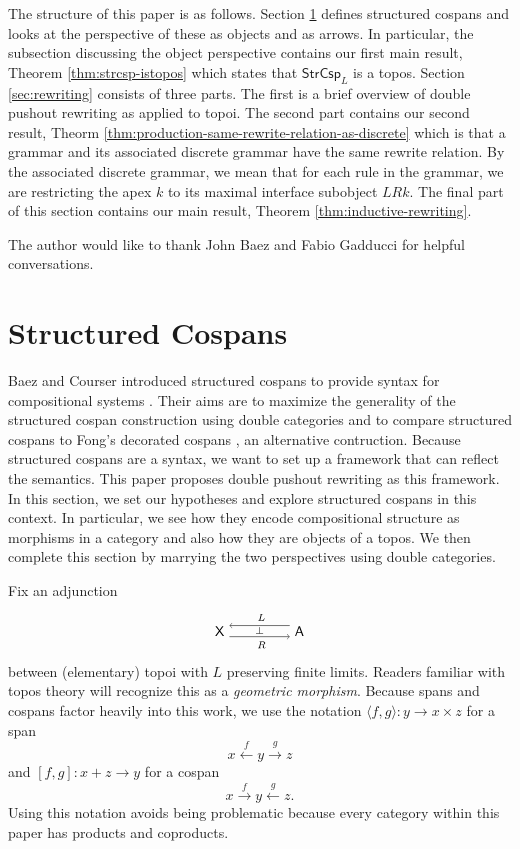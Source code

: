 \documentclass{amsart}
\newcommand{\A}{\cat{A}}
\newcommand{\X}{\cat{X}}
\newcommand{\StrCsp}{\cat{StrCsp}}
\newcommand{\cat}[1]{\mathsf{#1}}
\newcommand{\from}{\colon}
\newcommand{\xto}[1]{\xrightarrow{#1}}
\newcommand{\xgets}[1]{\xleftarrow{#1}}
\newcommand{\spn}[3]{#2 \to #1 \times #3}
\newcommand{\csp}[3]{#1 + #3 \to #2}
\theoremstyle{remark}
\theoremstyle{definition}
\newcommand{\adjunction}[4]{%
  \begin{tikzpicture}[baseline=-3pt]
    \node (1) at (0,0) {\( #1 \)};
    \node (2) at (2,0) {\( #4 \)};
    \draw [->]
    ([yshift= 4pt]2.west) to
    node [above] {\scriptsize{ $ #2 $ }}
    ([yshift= 4pt]1.east);
    \draw [->]
    ([yshift= -4pt]1.east) to
    node [below] {\scriptsize{ $ #3 $ }}
    node [above,yshift= -1.5pt] {\scriptsize{$ \perp $}}
    ([yshift= -4pt]2.west);
  \end{tikzpicture}
}
\begin{document}
The structure of this paper is as follows.  Section \ref{sec:StrCsp}
defines structured cospans and looks at the perspective of these as
objects and as arrows.  In particular, the subsection discussing the
object perspective contains our first main result, Theorem
\ref{thm:strcsp-istopos} which states that $ \StrCsp_L $ is a topos.
Section \ref{sec:rewriting} consists of three parts.  The first is a
brief overview of double pushout rewriting as applied to topoi.  The
second part contains our second result, Theorm
\ref{thm:production-same-rewrite-relation-as-discrete} which is that a
grammar and its associated discrete grammar have the same rewrite
relation.  By the associated discrete grammar, we mean that for each
rule in the grammar, we are restricting the apex $ k $ to its maximal
interface subobject $ LRk $.  The final part of this section contains
our main result, Theorem \ref{thm:inductive-rewriting}. 

The author would like to thank John Baez and Fabio Gadducci for
helpful conversations.


\section{Structured Cospans}
\label{sec:StrCsp}

Baez and Courser introduced structured cospans to provide syntax for
compositional systems \cite{StrCsp}.  Their aims are to maximize the
generality of the structured cospan construction using double
categories and to compare structured cospans to Fong's decorated
cospans \cite{DecorCsp}, an alternative contruction. Because
structured cospans are a syntax, we want to set up a framework that
can reflect the semantics. This paper proposes double pushout
rewriting as this framework.  In this section, we set our hypotheses
and explore structured cospans in this context. In particular, we see
how they encode compositional structure as morphisms in a category and
also how they are objects of a topos. We then complete this section by
marrying the two perspectives using double categories.

Fix an adjunction
%
\[
  \adjunction{\X}{L}{R}{\A}
\]
%
between (elementary) topoi with $ L $ preserving finite
limits. Readers familiar with topos theory will recognize this as a
\emph{geometric morphism}. Because spans and cospans factor heavily
into this work, we use the notation
%
\(
  \langle f,g \rangle \from \spn{x}{y}{z}
\)
% 
for a span
%
\[
  x \xgets{f} y \xto{g} z
\]
%
and
%
\(
  [ f,g ] \from \csp{x}{y}{z}
\)
% 
for a cospan
%
\[
  x \xto{f} y \xgets{g} z.
\]
% 
Using this notation avoids being problematic because every
category within this paper has products and coproducts.
\end{document}
